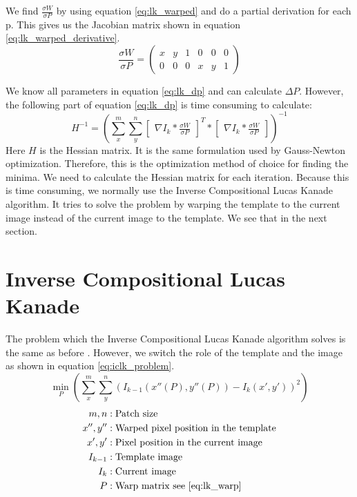 \documentclass[11pt,a4paper,titlepage,oneside]{report}
\begin{document}
We find $\frac{\sigma W}{\sigma P}$ by using equation \ref{eq:lk_warped} and do a partial derivation for each p. This gives us the Jacobian matrix shown in equation \ref{eq:lk_warped_derivative}.
\begin{equation}\label{eq:lk_warped_derivative}
  \frac{\sigma W}{\sigma P}=
  \begin{pmatrix}
    x & y & 1 & 0 & 0 & 0 \\
    0 & 0 & 0 & x & y & 1
  \end{pmatrix}
\end{equation}

We know all parameters in equation \ref{eq:lk_dp} and can calculate $\Delta P$. However, the following part of equation \ref{eq:lk_dp} is time consuming to calculate:
\begin{equation}
  H^{-1}=(\sum_x^m\sum_y^n\begin{bmatrix}\nabla I_{k}*\frac{\sigma W}{\sigma P}\end{bmatrix}^T*\begin{bmatrix}\nabla I_{k}*\frac{\sigma W}{\sigma P}\end{bmatrix})^{-1}
\end{equation}
Here $H$ is the Hessian matrix. It is the same formulation used by Gauss-Newton optimization. Therefore, this is the optimization method of choice for finding the minima. We need to calculate the Hessian matrix for each iteration. Because this is time consuming, we normally use the Inverse Compositional Lucas Kanade algorithm. It tries to solve the problem by warping the template to the current image instead of the current image to the template. We see that in the next section.

\section{Inverse Compositional Lucas Kanade}\label{sec:inv_comp_lk}
The problem which the Inverse Compositional Lucas Kanade algorithm solves is the same as before \cite{inverse_compositional}. However, we switch the role of the template and the image as shown in equation \ref{eq:iclk_problem}.
\begin{equation}\label{eq:iclk_problem}
  \min_P(\sum_x^m\sum_y^n(I_{k-1}(x''(P),y''(P))-I_{k}(x',y'))^2)
\end{equation}
\begin{align*}
  m,n        &: \text{Patch size}\\
  x'',y''    &: \text{Warped pixel position in the template}\\
  x',y'      &: \text{Pixel position in the current image}\\
  I_{k-1}    &: \text{Template image}\\
  I_{k}      &: \text{Current image}\\
  P          &: \text{Warp matrix see \ref{eq:lk_warp}}
\end{align*}
\end{document}
